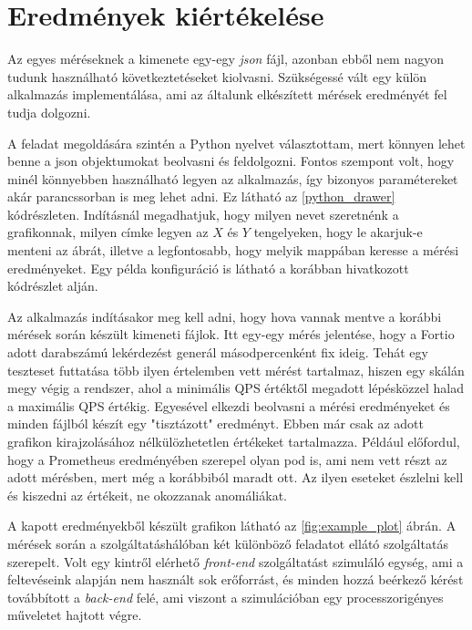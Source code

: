 \section{Eredmények kiértékelése}
Az egyes méréseknek a kimenete egy-egy \textit{json} fájl, azonban ebből nem nagyon tudunk használható következtetéseket kiolvasni. Szükségessé vált egy külön alkalmazás implementálása, ami az általunk elkészített mérések eredményét fel tudja dolgozni. 

A feladat megoldására szintén a Python nyelvet választottam, mert könnyen lehet benne a json objektumokat beolvasni és feldolgozni.
Fontos szempont volt, hogy minél könnyebben használható legyen az alkalmazás, így bizonyos paramétereket akár parancssorban is meg lehet adni. Ez látható az \ref{python_drawer} kódrészleten. Indításnál megadhatjuk, hogy milyen nevet szeretnénk a grafikonnak, milyen címke legyen az $X$ és $Y$ tengelyeken, hogy le akarjuk-e menteni az ábrát, illetve a legfontosabb, hogy melyik mappában keresse a mérési eredményeket. Egy példa konfiguráció is látható a korábban hivatkozott kódrészlet alján. \\

\lstset{caption=Eredményeket feldolgozó alkalmazás használata, label=python_drawer}


Az alkalmazás indításakor meg kell adni, hogy hova vannak mentve a korábbi mérések során készült kimeneti fájlok. Itt egy-egy mérés jelentése, hogy a Fortio adott darabszámú lekérdezést generál másodpercenként fix ideig. Tehát egy teszteset futtatása több ilyen értelemben vett mérést tartalmaz, hiszen egy skálán megy végig a rendszer, ahol a minimális QPS értéktől megadott lépésközzel halad a maximális QPS értékig. 
Egyesével elkezdi beolvasni a mérési eredményeket és minden fájlból készít egy "tisztázott" eredményt. Ebben már csak az adott grafikon kirajzolásához nélkülözhetetlen értékeket tartalmazza. Például előfordul, hogy a Prometheus eredményében szerepel olyan pod is, ami nem vett részt az adott mérésben, mert még a korábbiból maradt ott. Az ilyen eseteket észlelni kell és kiszedni az értékeit, ne okozzanak anomáliákat. 

A kapott eredményekből készült grafikon látható az \ref{fig:example_plot} ábrán. A mérések során a szolgáltatáshálóban két különböző feladatot ellátó szolgáltatás szerepelt. Volt egy kintről elérhető \textit{front-end} szolgáltatást szimuláló egység, ami a feltevéseink alapján nem használt sok erőforrást, és minden hozzá beérkező kérést továbbított a \textit{back-end} felé, ami viszont a szimulációban egy processzorigényes műveletet hajtott végre. 

